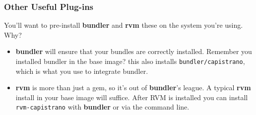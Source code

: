 \documentclass[t,handout]{beamer}
\begin{document}
\begin{frame}
\frametitle{Other Useful Plug-ins}
You'll want to pre-install {\bf bundler} and {\bf rvm} these on the system you're using. Why?
\begin{itemize}
\item {\bf bundler} will ensure that your bundles are correctly installed.  Remember you installed bundler in the base image? this also installs {\small\tt bundler/capistrano}, which is what you use to integrate bundler.
\item {\bf rvm} is more than just a gem, so it's out of {\bf bundler}'s league.  A typical {\bf rvm} install in your base image will suffice.  After RVM is installed you can install {\small\tt rvm-capistrano} with {\bf bundler} or via the command line.
\end{itemize}
\end{frame}

\begin{frame}

\end{frame}
\end{document}
